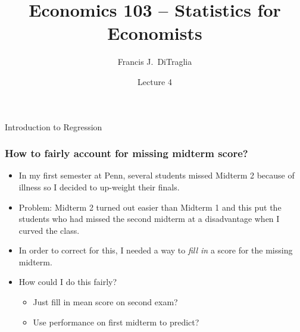 \documentclass[handout]{beamer}
\title[Econ 103]{Economics 103 -- Statistics for Economists}
\author[F.J.\ DiTraglia]{Francis J.\ DiTraglia}
\institute[UPenn]{University of Pennsylvania}
\date{Lecture 4}
\begin{document}
 





\begin{frame}[plain]
	\titlepage 
	

\end{frame} 
\begin{frame}

\begin{center}
 \Huge Introduction to Regression
\end{center}

\end{frame}
\begin{frame}
\frametitle{How to fairly account for missing midterm score?}
	\begin{itemize}
		\item In my first semester at Penn, several students missed Midterm 2 because of illness so I decided to up-weight their finals. 
		\item Problem: Midterm 2 turned out easier than Midterm 1 and this put the students who had missed the second midterm at a disadvantage when I curved the class.
	\item In order to correct for this, I needed a way to \emph{\alert{fill in}} a score for the missing midterm.
	\item How could I do this fairly?\pause
		\begin{itemize}
			\item Just fill in mean score on second exam?\pause
			\item Use performance on first midterm to predict?
		\end{itemize}
\end{itemize}

\end{frame}
\end{document}
